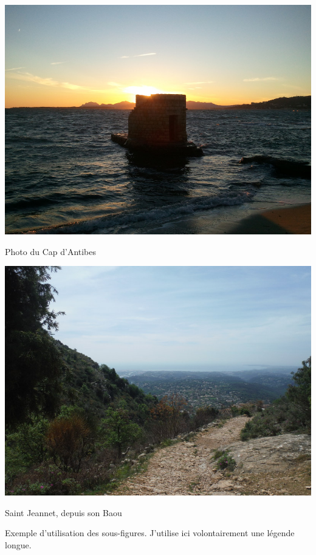 	\begin{figureth}
		\begin{subfigureth}{0.4\textwidth}
			\includegraphics[width=\linewidth]{Chapter1/img/Antibes}
			\caption{Photo du Cap d'Antibes}
				\label{sub:Antibes}
		\end{subfigureth}
		\begin{subfigureth}{0.4\textwidth}
			\includegraphics[width=\linewidth]{Chapter1/img/SaintJeannet}
			\caption{Saint Jeannet, depuis son Baou}
				\label{sub:SaintJeannet}
		\end{subfigureth}
		\caption[Légende courte pour la figure]{Exemple d'utilisation des sous-figures. J'utilise ici volontairement une légende longue.}
			\label{fig:exemple}
	\end{figureth}

